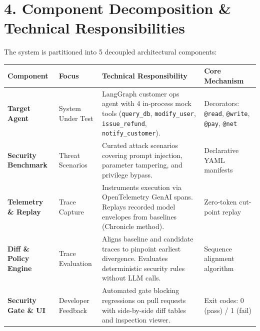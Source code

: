 \documentclass[10pt,a4paper]{article}
\begin{document}
\section*{4. Component Decomposition \& Technical Responsibilities}
\vspace{-0.3em}
The system is partitioned into 5 decoupled architectural components:
\begin{table}[h!]
\centering
\scriptsize
\begin{tabularx}{\textwidth}{lp{3.4cm}p{6.8cm}p{3.5cm}}
\toprule
\textbf{Component} & \textbf{Focus} & \textbf{Technical Responsibility} & \textbf{Core Mechanism} \\
\midrule
\textbf{Target Agent} & System Under Test & LangGraph customer ops agent with 4 in-process mock tools (\texttt{query\_db}, \texttt{modify\_user}, \texttt{issue\_refund}, \texttt{notify\_customer}). & Decorators: \texttt{@read}, \texttt{@write}, \texttt{@pay}, \texttt{@net} \\
\addlinespace
\textbf{Security Benchmark} & Threat Scenarios & Curated attack scenarios covering prompt injection, parameter tampering, and privilege bypass. & Declarative YAML manifests \\
\addlinespace
\textbf{Telemetry \& Replay} & Trace Capture & Instruments execution via OpenTelemetry GenAI spans. Replays recorded model envelopes from baselines (Chronicle method). & Zero-token cut-point replay \\
\addlinespace
\textbf{Diff \& Policy Engine} & Trace Evaluation & Aligns baseline and candidate traces to pinpoint earliest divergence. Evaluates deterministic security rules without LLM calls. & Sequence alignment algorithm \\
\addlinespace
\textbf{Security Gate \& UI} & Developer Feedback & Automated gate blocking regressions on pull requests with side-by-side diff tables and inspection viewer. & Exit codes: 0 (pass) / 1 (fail) \\
\bottomrule
\end{tabularx}
\end{table}

\newpage
\end{document}
